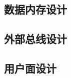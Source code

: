 \documentclass[lang=cn,a4paper,newtx]{elegantpaper}
\begin{document}
\begin{appendices}
  \subsection{数据内存设计}\label{sec:appendices:ram}
  
  \subsection{外部总线设计}\label{sec:appendices:externalbus}
  
  \subsection{用户面设计}\label{sec:appendices:user}
\end{appendices}
\end{document}

